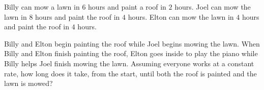 Billy can mow a lawn in $6$ hours and paint a roof in $2$ hours. Joel can mow the lawn in $8$ hours and paint the roof in $4$ hours. Elton can mow the lawn in $4$ hours and paint the roof in $4$ hours.

Billy and Elton begin painting the roof while Joel begins mowing the lawn. When Billy and Elton finish painting the roof, Elton goes inside to play the piano while Billy helps Joel finish mowing the lawn. Assuming everyone works at a constant rate, how long does it take, from the start, until both the roof is painted and the lawn is mowed?
